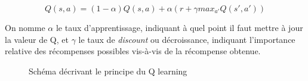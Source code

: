 \documentclass[
    10pt,
    a4paper,
    oneside,
    headinclude,footinclude,
    BCOR=5mm,
    captions=tableabove
]{scrartcl}
\begin{document}
$$Q(s,a) = (1-\alpha) Q(s,a) + \alpha (r + \gamma max_{a'} Q(s',a') )$$

On nomme $\alpha$ le taux d'apprentissage, indiquant à quel point il faut mettre à jour la valeur de Q, et $\gamma$ le taux de \textit{discount} ou décroissance, indiquant l'importance relative des récompenses possibles vis-à-vis de la récompense obtenue.

\begin{figure}[h!]
\newline
{}
\centering
\caption{Schéma décrivant le principe du Q learning}
\label{fig:Qlearning.png}
\end{figure}
\end{document}
